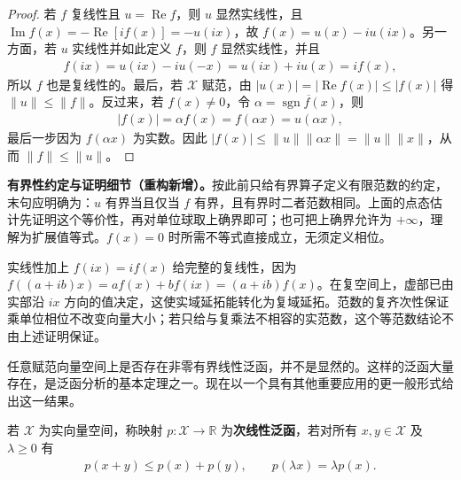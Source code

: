 \documentclass[../../main.tex]{subfiles}
\begin{document}
\begin{proof}
若 $f$ 复线性且 $u=\operatorname{Re}f$，则 $u$ 显然实线性，且 $\operatorname{Im}f(x)=-\operatorname{Re}[if(x)]=-u(ix)$，故 $f(x)=u(x)-iu(ix)$。另一方面，若 $u$ 实线性并如此定义 $f$，则 $f$ 显然实线性，并且
\begin{align*}
f(ix)=u(ix)-iu(-x)=u(ix)+iu(x)=if(x),
\end{align*}
所以 $f$ 也是复线性的。最后，若 $\mathcal X$ 赋范，由 $|u(x)|=|\operatorname{Re}f(x)|\le|f(x)|$ 得 $\|u\|\le\|f\|$。反过来，若 $f(x)\ne0$，令 $\alpha=\overline{\operatorname{sgn}f(x)}$，则
\begin{align*}
|f(x)|=\alpha f(x)=f(\alpha x)=u(\alpha x),
\end{align*}
最后一步因为 $f(\alpha x)$ 为实数。因此 $|f(x)|\le\|u\|\|\alpha x\|=\|u\|\|x\|$，从而 $\|f\|\le\|u\|$。
\end{proof}
\begin{remark}
\textbf{有界性约定与证明细节（重构新增）。}按此前只给有界算子定义有限范数的约定，末句应明确为：$u$ 有界当且仅当 $f$ 有界，且有界时二者范数相同。上面的点态估计先证明这个等价性，再对单位球取上确界即可；也可把上确界允许为 $+\infty$，理解为扩展值等式。$f(x)=0$ 时所需不等式直接成立，无须定义相位。

实线性加上 $f(ix)=if(x)$ 给完整的复线性，因为 $f((a+ib)x)=af(x)+bf(ix)=(a+ib)f(x)$。在复空间上，虚部已由实部沿 $ix$ 方向的值决定，这使实域延拓能转化为复域延拓。范数的复齐次性保证乘单位相位不改变向量大小；若只给与复乘法不相容的实范数，这个等范数结论不由上述证明保证。
\end{remark}
任意赋范向量空间上是否存在非零有界线性泛函，并不是显然的。这样的泛函大量存在，是泛函分析的基本定理之一。现在以一个具有其他重要应用的更一般形式给出这一结果。
\begin{definition}[次线性泛函]\label{definition:ch05-sublinear-functional}
若 $\mathcal X$ 为实向量空间，称映射 $p:\mathcal X\to\mathbb R$ 为\textbf{次线性泛函}，若对所有 $x,y\in\mathcal X$ 及 $\lambda\ge0$ 有
\begin{align*}
p(x+y)\le p(x)+p(y),\qquad p(\lambda x)=\lambda p(x).
\end{align*}
\end{definition}
\end{document}
